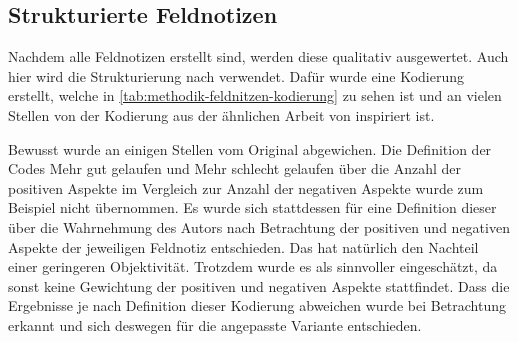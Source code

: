 \subsection{Strukturierte Feldnotizen}
\label{sec:methodik-auswertung-feldnotizen}

Nachdem alle Feldnotizen erstellt sind, werden diese qualitativ ausgewertet.
Auch hier wird die Strukturierung nach  verwendet.
Dafür wurde eine Kodierung erstellt, welche in \cref{tab:methodik-feldnitzen-kodierung} zu sehen ist und an vielen Stellen von der Kodierung aus der ähnlichen Arbeit von  inspiriert ist.



Bewusst wurde an einigen Stellen vom Original abgewichen.
Die Definition der Codes \glqq Mehr gut gelaufen\grqq{} und \glqq Mehr schlecht gelaufen\grqq{} über die Anzahl der positiven Aspekte im Vergleich zur Anzahl der negativen Aspekte wurde zum Beispiel nicht übernommen.
Es wurde sich stattdessen für eine Definition dieser über die Wahrnehmung des Autors nach Betrachtung der positiven und negativen Aspekte der jeweiligen Feldnotiz entschieden.
Das hat natürlich den Nachteil einer geringeren Objektivität.
Trotzdem wurde es als sinnvoller eingeschätzt, da sonst keine Gewichtung der positiven und negativen Aspekte stattfindet.
Dass die Ergebnisse je nach Definition dieser Kodierung abweichen wurde bei Betrachtung erkannt und sich deswegen für die angepasste Variante entschieden.

